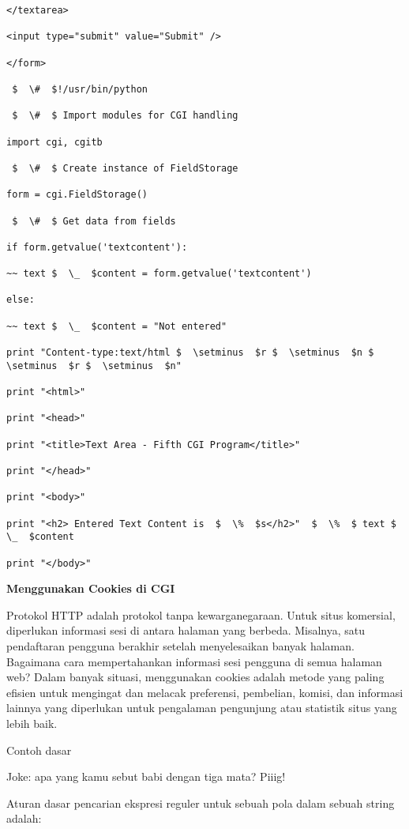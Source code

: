 \begin{enumerate}
\begin{enumerate}
\begin{verbatim}
</textarea>

<input type="submit" value="Submit" />

</form>

 $  \#  $!/usr/bin/python

 $  \#  $ Import modules for CGI handling

import cgi, cgitb

 $  \#  $ Create instance of FieldStorage

form = cgi.FieldStorage()

 $  \#  $ Get data from fields

if form.getvalue('textcontent'):

~~ text $  \_  $content = form.getvalue('textcontent')

else:

~~ text $  \_  $content = "Not entered"

print "Content-type:text/html $  \setminus  $r $  \setminus  $n $  \setminus  $r $  \setminus  $n"

print "<html>"

print "<head>"

print "<title>Text Area - Fifth CGI Program</title>"

print "</head>"

print "<body>"

print "<h2> Entered Text Content is  $  \%  $s</h2>"  $  \%  $ text $  \_  $content

print "</body>"

\end{verbatim}

{\fontsize{14pt}{14pt}\selectfont \textbf{Menggunakan Cookies di CGI} \\}

Protokol HTTP adalah protokol tanpa kewarganegaraan. Untuk situs komersial, diperlukan informasi sesi di antara halaman yang berbeda. Misalnya, satu pendaftaran pengguna berakhir setelah menyelesaikan banyak halaman. Bagaimana cara mempertahankan informasi sesi pengguna di semua halaman web? Dalam banyak situasi, menggunakan cookies adalah metode yang paling efisien untuk mengingat dan melacak preferensi, pembelian, komisi, dan informasi lainnya yang diperlukan untuk pengalaman pengunjung atau statistik situs yang lebih baik.

Contoh dasar

Joke: apa yang kamu sebut babi dengan tiga mata? Piiig!

Aturan dasar pencarian ekspresi reguler untuk sebuah pola dalam sebuah string adalah:


\end{enumerate}
\end{enumerate}
